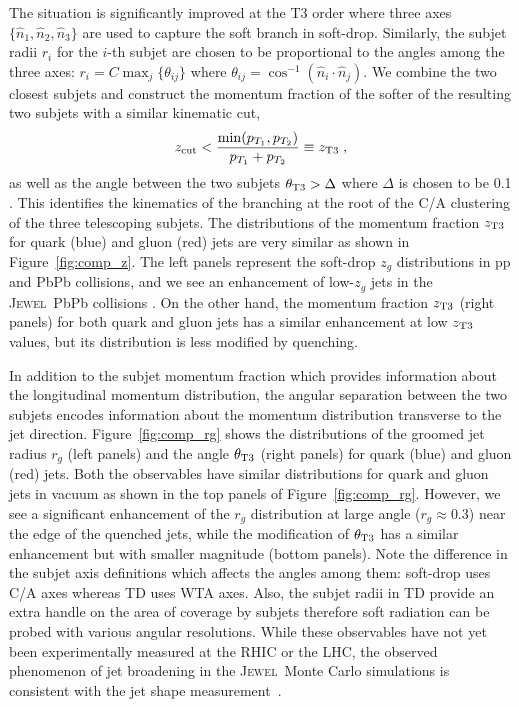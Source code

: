 \documentclass[notoc,preprintnumbers]{JHEP3}
\newcommand{\jw}{\textsc{Jewel}~}
\begin{document}
The situation is significantly improved at the T3 order where three axes $\{\hat n_1,\hat n_2,\hat n_3\}$ are used to capture the soft branch in soft-drop. Similarly, the subjet radii $r_i$ for the $i$-th subjet are chosen to be proportional to the angles among the three axes: $r_i = C \max_{j} \{\theta_{ij}\}$ where $\theta_{ij}=\cos^{-1}(\hat n_i\cdot\hat n_j)$. We combine the two closest subjets and construct the momentum fraction of the softer of the resulting two subjets with a similar kinematic cut,
\begin{equation}
    z_{\rm cut} < \frac{\min(p_{T_1},p_{T_2})}{p_{T_1}+p_{T_2}} \equiv z_{\rm T3}\;,
\label{T3_z}
\end{equation}
as well as the angle between the two subjets $\theta_{\rm T3} > \Delta$ where $\Delta$ is chosen to be 0.1 \cite{Sirunyan:2017bsd}. 
This identifies the kinematics of the branching at the root of the C/A clustering of the three telescoping subjets. The distributions of the momentum fraction $z_{\rm T3}$ for quark (blue) and gluon (red) jets are very similar as shown in Figure~\ref{fig:comp_z}.
The left panels represent the soft-drop $z_{g}$ distributions in pp and PbPb collisions, and we see an enhancement of low-$z_g$ jets in the \jw PbPb collisions \cite{KunnawalkamElayavalli:2017hxo,Milhano:2017nzm}. On the other hand, the momentum fraction $z_{\rm T3}$ (right panels) for both quark and gluon jets has a similar enhancement at low $z_{\rm T3}$ values, but its distribution is less modified by quenching.

In addition to the subjet momentum fraction which provides information about the longitudinal momentum distribution, the angular separation between the two subjets encodes information about the momentum distribution transverse to the jet direction. Figure~\ref{fig:comp_rg} shows the distributions of the groomed jet radius $r_g$ (left panels) and the angle $\theta_{\rm T3}$ (right panels) for quark (blue) and gluon (red) jets. %
Both the observables have similar distributions for quark and gluon jets in vacuum as shown in the top panels of Figure~\ref{fig:comp_rg}. However, we see a significant enhancement of the $r_g$ distribution at large angle ($r_g\approx0.3$) near the edge of the quenched jets, while the modification of $\theta_{\rm T3}$ has a similar enhancement but with smaller magnitude (bottom panels). Note the difference in the subjet axis definitions which affects the angles among them: soft-drop uses C/A axes whereas TD uses WTA axes. Also, the subjet radii in TD provide an extra handle on the area of coverage by subjets therefore soft radiation can be probed with various angular resolutions. While these observables have not yet been experimentally measured at the RHIC or the LHC, the observed phenomenon of jet broadening in the \jw Monte Carlo simulations is consistent with the jet shape measurement~\cite{Chatrchyan:2013kwa}.
\end{document}
